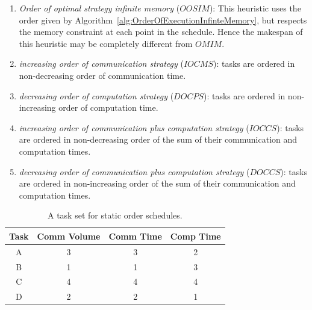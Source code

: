 \documentclass[sigconf]{acmart}
\begin{document}
	
	\begin{enumerate}[label=\roman*)]
		\item \textit{Order  of  optimal strategy infinite memory} ($OOSIM$): This heuristic uses the order given by Algorithm~\ref{alg:OrderOfExecutionInfinteMemory}, but respects the memory constraint at each point in the schedule. Hence the makespan of this heuristic may be completely different from $OMIM$.
		
		\item \textit{increasing order of communication strategy} ($IOCMS$): tasks are ordered  in non-decreasing order of communication time. 
		
		\item \textit{decreasing order of computation strategy} ($DOCPS$): tasks are ordered in non-increasing order of computation time. 
		\item \textit{increasing order of communication plus computation strategy} ($IOCCS$): tasks are ordered in non-decreasing order of the sum of their communication and computation times.
		\item \textit{decreasing order of communication plus computation strategy} ($DOCCS$): tasks are ordered in non-increasing order of the sum of their communication and computation times.
		
	\end{enumerate}
	\begin{table}[htb]
		\begin{center}
			
			\begin{tabular}{|c|c|c|c|}
				\hline
				Task & Comm Volume & Comm Time & Comp Time\\ \hline 
				A & 3 & 3 &  2\\ \hline
				B & 1 & 1 & 3\\ \hline
				C & 4 & 4 & 4\\ \hline
				D & 2 & 2 & 1\\ \hline
			\end{tabular}
			\caption{\label{tab:staticOrderExample} A task set for static order schedules.}
		\end{center}
	\end{table}
	
\end{document}
